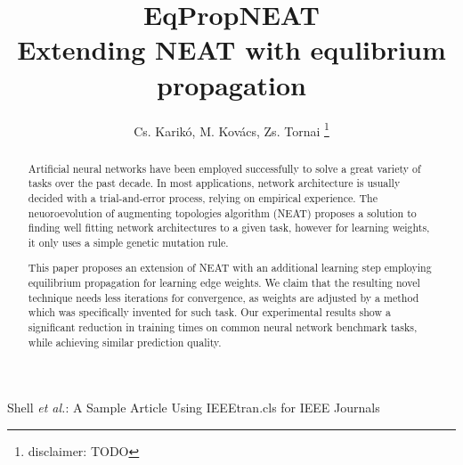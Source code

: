 \documentclass[lettersize,journal]{IEEEtran}
\begin{document}
\title{EqPropNEAT\\Extending NEAT with equlibrium propagation}

\author{Cs. Karikó, M. Kovács, Zs. Tornai
\thanks{disclaimer: TODO}
}

%
{Shell \MakeLowercase{\textit{et al.}}: A Sample Article Using IEEEtran.cls for IEEE Journals}


\maketitle

\begin{abstract}
  Artificial neural networks have been employed successfully to solve a great variety of tasks over the past decade. In most applications, network architecture is usually decided with a trial-and-error process, relying on empirical experience.
  The neuoroevolution of augmenting topologies algorithm (NEAT) \cite{neat} proposes a solution to finding well fitting network architectures to a given task, however for learning weights, it only uses a simple genetic mutation rule.

  This paper proposes an extension of NEAT with an additional learning step employing equilibrium propagation \cite{eqprop} for learning edge weights. We claim that the resulting novel technique needs less iterations for convergence, as weights are adjusted by a method which was specifically invented for such task. Our experimental results show a significant reduction in training times on common neural network benchmark tasks, while achieving similar prediction quality.
\end{abstract}

\end{document}
